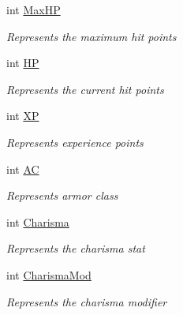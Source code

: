 \begin{DoxyCompactItemize}
int \mbox{\hyperlink{class_dungeons__n___dragons___manager_1_1_models_1_1_character_a4a9b0a0a7a00ddd5fe73631411b6aef6}{Max\+HP}}
\begin{DoxyCompactList}\small\item\em Represents the maximum hit points \end{DoxyCompactList}\item 
int \mbox{\hyperlink{class_dungeons__n___dragons___manager_1_1_models_1_1_character_abb493b3e1a1276265bb10a8381656823}{HP}}
\begin{DoxyCompactList}\small\item\em Represents the current hit points \end{DoxyCompactList}\item 
int \mbox{\hyperlink{class_dungeons__n___dragons___manager_1_1_models_1_1_character_ae432e9bde7e18ec22eb09cea29cf1ec4}{XP}}
\begin{DoxyCompactList}\small\item\em Represents experience points \end{DoxyCompactList}\item 
int \mbox{\hyperlink{class_dungeons__n___dragons___manager_1_1_models_1_1_character_ad8c845675ef4c76f306625d63b974b1c}{AC}}
\begin{DoxyCompactList}\small\item\em Represents armor class \end{DoxyCompactList}\item 
int \mbox{\hyperlink{class_dungeons__n___dragons___manager_1_1_models_1_1_character_aaabc2ca870fa07b4a24c196db0ce611e}{Charisma}}
\begin{DoxyCompactList}\small\item\em Represents the charisma stat \end{DoxyCompactList}\item 
int \mbox{\hyperlink{class_dungeons__n___dragons___manager_1_1_models_1_1_character_a61cbd156382288332cc9f19af658b9d7}{Charisma\+Mod}}
\begin{DoxyCompactList}\small\item\em Represents the charisma modifier \end{DoxyCompactList}\item 

\end{DoxyCompactItemize}
